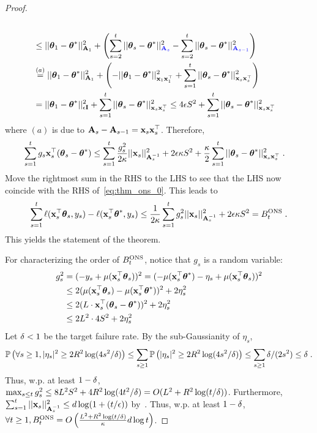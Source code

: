 \begin{proof}
\begin{equation*}
\begin{aligned}
  \\&\le ||\th_1 - \th^* ||^2_{\A_1} + \lt(\sum_{s=2}^t || \th_s - \th^* ||^2_{\blue{\A_s}} - \sum_{s=2}^t ||\th_s - \th^*||^2_{\blue{\A_{s-1}}}\rt) 
  \\&\stackrel{(a)}{=} ||\th_1 - \th^* ||^2_{\A_1} + \lt(- ||\th_1-\th^*||^2_{\x_1\x_1^\T} + \sum_{s=1}^t ||\th_s-\th^*||^2_{\x_s\x_s^\T}\rt)
  \\&=  ||\th_1 - \th^* ||^2_{\eps\I} + \sum_{s=1}^t ||\th_s-\th^*||^2_{\x_s\x_s^\T}
     \le  4\eps S^2 + \sum_{s=1}^t ||\th_s-\th^*||^2_{\x_s\x_s^\T}
  \end{aligned}\end{equation*}
  where $(a)$ is due to $\mathbf{A}_s - \mathbf{A}_{s-1} = \mathbf{x}_s\mathbf{x}_s^{\top}$.
  Therefore,
  \begin{equation*}\begin{aligned}
    \sum_{s=1}^t  g_s\mathbf{x}_s^{\top}({{\boldsymbol \theta}}_s-{{\boldsymbol \theta}}^*) 
  &\le \sum_{s=1}^t{ \frac{g_s^2}{2{\kappa}} }||\mathbf{x}_s||^2_{\mathbf{A}_s^{-1}} + 2\epsilon {\ensuremath{\kappa}} S^2 + { \frac{{\kappa}}{2} }\sum_{s=1}^t ||{{\boldsymbol \theta}}_s - {{\boldsymbol \theta}}^*||^2_{\mathbf{x}_s\mathbf{x}_s^{\top}}  \;.
  \end{aligned}\end{equation*}
  Move the rightmost sum in the RHS to the LHS to see that the LHS now coincide with the RHS of~\eqref{eq:thm_ons_0}.
  This leads to
  \begin{equation*}\begin{aligned}
    \sum_{s=1}^t \ell(\mathbf{x}_s^{\top} {{\boldsymbol \theta}}_s, y_s) - \ell(\mathbf{x}_s^{\top}{{\boldsymbol \theta}}^*, y_s) \le { \frac{1}{2{\ensuremath{\kappa}}} } \sum_{s=1}^t g_s^2||\mathbf{x}_s||^2_{\mathbf{A}_s^{-1}} + 2\epsilon {\ensuremath{\kappa}} S^2 = B^{\text{\normalfont ONS}}_t \;.
  \end{aligned}\end{equation*}
  This yields the statement of the theorem.

  For characterizing the order of $B^{\text{\normalfont ONS}}_t$, notice that $g_s$ is a random variable:
  \begin{equation*}\begin{aligned}
    g_s^2 
    &=   ( -y_s + \mu(\mathbf{x}_s^{\top}{{\boldsymbol \theta}}_s) )^2 = ( -\mu(\mathbf{x}_s^{\top}{{\boldsymbol \theta}}^*) - \eta_s + \mu(\mathbf{x}_s^{\top}{{\boldsymbol \theta}}_s) )^2
  \\&\le 2(\mu(\mathbf{x}_s^{\top}{{\boldsymbol \theta}}_s) - \mu(\mathbf{x}_s^{\top}{{\boldsymbol \theta}}^*))^2 + 2\eta_s^2
  \\&\le 2(L\cdot\mathbf{x}_s^{\top}({{\boldsymbol \theta}}_s - {{\boldsymbol \theta}}^*))^2 + 2\eta_s^2
  \\&\le 2L^2\cdot 4S^2 + 2\eta_s^2
  \end{aligned}\end{equation*}
  Let ${\delta}<1$ be the target failure rate.
  By the sub-Gaussianity of $\eta_s$, 
  \[
    \mathbb{P}\left( \forall s\ge1, |\eta_s|^2 \ge 2R^2\log(4s^2/{\delta})\right) \le \sum_{s\ge1} \mathbb{P}\left(|\eta_s|^2 \ge 2R^2\log(4s^2/{\delta})\right) \le \sum_{s\ge1} {\delta}/(2s^2) \le {\ensuremath{\delta}} \;.
  \]
  Thus, w.p. at least $1-{\delta}$, $\max_{s\le t} g_s^2 \le 8L^2S^2 + 4R^2\log(4 t^2/{\delta}) = O(L^2+R^2\log(t/{\delta}))$.
  Furthermore, $\sum_{s=1}^t ||\mathbf{x}_s||^2_{\mathbf{A}_s^{-1}} \le d\log ( 1+ (t/\epsilon)) $ by~\citet[Lemma 11]{hazan07logarithmic}.
  Thus,  w.p. at least $1-{\delta}$, $\forall t\ge1, B^{\text{\normalfont ONS}}_t = O\left({ \frac{L^2 + R^2\log(t/{\delta})}{{\kappa}} }d\log t\right)$.


\end{proof}
